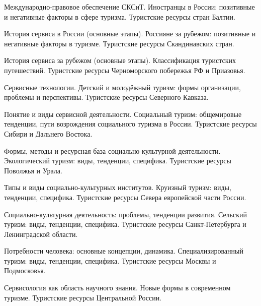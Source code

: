 \documentclass[
	11pt,
	a4paper,
	]
	{article}
\begin{document}
\bigskip

\noindent{} 
	{
		Международно-правовое обеспечение СКСиТ.
	}{
		Иностранцы в России: позитивные и негативные факторы в сфере туризма.
	}{
		Туристские ресурсы стран Балтии.
	}

\bigskip

\noindent{} 
	{
		История сервиса в России (основные этапы).
	}{
		Россияне за рубежом: позитивные и негативные факторы в туризме.
	}{
		Туристские ресурсы Скандинавских стран.
	}

\bigskip

\noindent{} 
	{
		История сервиса за рубежом (основные этапы).
	}{
		Классификация туристских путешествий.
	}{
		Туристские ресурсы Черноморского побережья РФ и Приазовья.
	}

\bigskip

\noindent{} 
	{
		Сервисные технологии.
	}{
		Детский и молодёжный туризм: формы организации, проблемы и перспективы.
	}{
		Туристские ресурсы Северного Кавказа.
	}

\bigskip

\noindent{} 
	{
		Понятие и виды сервисной деятельности.
	}{
		Социальный туризм: общемировые тенденции, пути возрождения социального туризма в России.
	}{
		Туристские ресурсы Сибири и Дальнего Востока.
	}

\bigskip

\noindent{} 
	{
		Формы, методы и ресурсная база социально-культурной деятельности.
	}{
		Экологический туризм: виды, тенденции, специфика.
	}{
		Туристские ресурсы Поволжья и Урала.
	}

\bigskip

\noindent{} 
	{
		Типы и виды социально-культурных институтов.
	}{
		Круизный туризм: виды, тенденции, специфика.
	}{
		Туристские ресурсы Севера европейской части России.
	}

\bigskip

\noindent{} 
	{
		Социально-культурная деятельность: проблемы, тенденции развития.
	}{
		Сельский туризм: виды, тенденции, специфика.
	}{
		Туристские ресурсы Санкт-Петербурга и Ленинградской области.
	}

\bigskip

\noindent{} 
	{
		Потребности человека: основные концепции, динамика.
	}{
		Специализированный туризм: виды, тенденции, специфика.
	}{
		Туристские ресурсы Москвы и Подмосковья.
	}

\bigskip

\noindent{} 
	{
		Сервисология как область научного знания.
	}{
		Новые формы в современном туризме.
	}{
		Туристские ресурсы Центральной России.
	}

\bigskip
\end{document}
